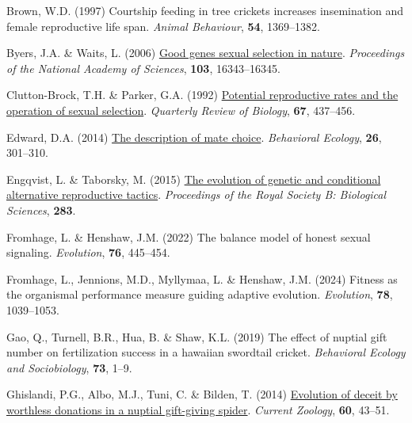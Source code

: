 \documentclass[
]{article}
\newlength{\cslhangindent}
\newlength{\cslentryspacingunit} %
\newenvironment{CSLReferences}[2] %
 {%
  \setlength{\parindent}{0pt}
  \ifodd #1
  \let\oldpar\par
  \def\par{\hangindent=\cslhangindent\oldpar}
  \fi
  \setlength{\parskip}{#2\cslentryspacingunit}
 }%
 {}
\begin{document}
\begin{CSLReferences}{0}{0}
\leavevmode{}%
Brown, W.D. (1997) Courtship feeding in tree crickets increases
insemination and female reproductive life span. \emph{Animal Behaviour},
\textbf{54}, 1369--1382.

\leavevmode{}%
Byers, J.A. \& Waits, L. (2006)
\href{https://doi.org/10.1073/pnas.0608184103}{{Good genes sexual
selection in nature}}. \emph{Proceedings of the National Academy of
Sciences}, \textbf{103}, 16343--16345.

\leavevmode{}%
Clutton-Brock, T.H. \& Parker, G.A. (1992)
\href{https://doi.org/10.1086/417793}{{Potential reproductive rates and
the operation of sexual selection}}. \emph{Quarterly Review of Biology},
\textbf{67}, 437--456.

\leavevmode{}%
Edward, D.A. (2014) \href{https://doi.org/10.1093/beheco/aru142}{The
description of mate choice}. \emph{Behavioral Ecology}, \textbf{26},
301--310.

\leavevmode{}%
Engqvist, L. \& Taborsky, M. (2015)
\href{https://doi.org/10.1098/rspb.2015.2945}{{The evolution of genetic
and conditional alternative reproductive tactics}}. \emph{Proceedings of
the Royal Society B: Biological Sciences}, \textbf{283}.

\leavevmode{}%
Fromhage, L. \& Henshaw, J.M. (2022) The balance model of honest sexual
signaling. \emph{Evolution}, \textbf{76}, 445--454.

\leavevmode{}%
Fromhage, L., Jennions, M.D., Myllymaa, L. \& Henshaw, J.M. (2024)
Fitness as the organismal performance measure guiding adaptive
evolution. \emph{Evolution}, \textbf{78}, 1039--1053.

\leavevmode{}%
Gao, Q., Turnell, B.R., Hua, B. \& Shaw, K.L. (2019) The effect of
nuptial gift number on fertilization success in a hawaiian swordtail
cricket. \emph{Behavioral Ecology and Sociobiology}, \textbf{73}, 1--9.

\leavevmode{}%
Ghislandi, P.G., Albo, M.J., Tuni, C. \& Bilden, T. (2014)
\href{https://www.ptonline.com/articles/how-to-get-better-mfi-results}{{Evolution
of deceit by worthless donations in a nuptial gift-giving spider}}.
\emph{Current Zoology}, \textbf{60}, 43--51.


\end{CSLReferences}
\end{document}
